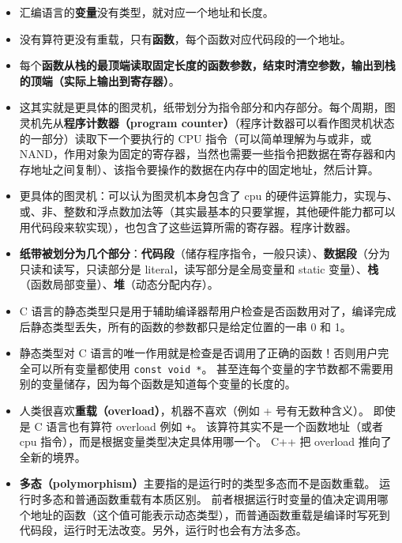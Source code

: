\begin{itemize}
\item 汇编语言的\textbf{变量}没有类型，就对应一个地址和长度。
\item 没有算符更没有重载，只有\textbf{函数}，每个函数对应代码段的一个地址。
\item 每个\textbf{函数从栈的最顶端读取固定长度的函数参数，结束时清空参数，输出到栈的顶端（实际上输出到寄存器）}。
\item 这其实就是更具体的图灵机，纸带划分为指令部分和内存部分。每个周期，图灵机先从\textbf{程序计数器（program counter）}（程序计数器可以看作图灵机状态的一部分）读取下一个要执行的 CPU 指令（可以简单理解为与或非，或 NAND，作用对象为固定的寄存器，当然也需要一些指令把数据在寄存器和内存地址之间复制）、该指令要操作的数据在内存中的固定地址，然后计算。
\item 更具体的图灵机：可以认为图灵机本身包含了 cpu 的硬件运算能力，实现与、或、非、整数和浮点数加法等（其实最基本的只要掌握，其他硬件能力都可以用代码段来软实现），也包含了这些运算所需的寄存器。程序计数器。
\item \textbf{纸带被划分为几个部分}：\textbf{代码段}（储存程序指令，一般只读）、\textbf{数据段}（分为只读和读写，只读部分是 literal，读写部分是全局变量和 static 变量）、\textbf{栈}（函数局部变量）、\textbf{堆}（动态分配内存）。
\item C 语言的静态类型只是用于辅助编译器帮用户检查是否函数用对了，编译完成后静态类型丢失，所有的函数的参数都只是给定位置的一串 0 和 1。
\item 静态类型对 C 语言的唯一作用就是检查是否调用了正确的函数！否则用户完全可以所有变量都使用 \verb`const void *`。 甚至连每个变量的字节数都不需要用别的变量储存，因为每个函数是知道每个变量的长度的。
\item 人类很喜欢\textbf{重载（overload）}，机器不喜欢（例如 + 号有无数种含义）。 即使是 C 语言也有算符 overload 例如 \verb`+`。 该算符其实不是一个函数地址（或者 cpu 指令），而是根据变量类型决定具体用哪一个。 C++ 把 overload 推向了全新的境界。
\item \textbf{多态（polymorphism）}主要指的是运行时的类型多态而不是函数重载。 运行时多态和普通函数重载有本质区别。 前者根据运行时变量的值决定调用哪个地址的函数（这个值可能表示动态类型），而普通函数重载是编译时写死到代码段，运行时无法改变。另外，运行时也会有方法多态。
\end{itemize}
